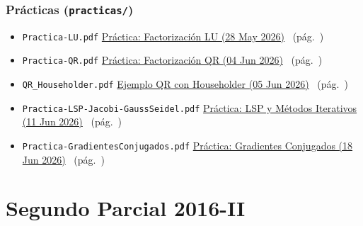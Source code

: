 \documentclass[11pt,a4paper]{article}
\begin{document}
\subsubsection*{Pr\'acticas (\texttt{practicas/})}
\begin{itemize}[leftmargin=0pt, itemsep=3pt, label={}]
  \item \texttt{Practica-LU.pdf}
    \dotfill \hyperref[sec:practica_lu_1]{Pr\'actica: Factorizaci\'on LU (28 May 2026)}
    \ (p\'ag.~\pageref{sec:practica_lu_1})

  \item \texttt{Practica-QR.pdf}
    \dotfill \hyperref[sec:practica_qr]{Pr\'actica: Factorizaci\'on QR (04 Jun 2026)}
    \ (p\'ag.~\pageref{sec:practica_qr})

  \item \texttt{QR\_Householder.pdf}
    \dotfill \hyperref[sec:householder_ejemplo]{Ejemplo QR con Householder (05 Jun 2026)}
    \ (p\'ag.~\pageref{sec:householder_ejemplo})

  \item \texttt{Practica-LSP-Jacobi-GaussSeidel.pdf}
    \dotfill \hyperref[sec:practica_lsp_jacobi]{Pr\'actica: LSP y M\'etodos Iterativos (11 Jun 2026)}
    \ (p\'ag.~\pageref{sec:practica_lsp_jacobi})

  \item \texttt{Practica-GradientesConjugados.pdf}
    \dotfill \hyperref[sec:practica_gc]{Pr\'actica: Gradientes Conjugados (18 Jun 2026)}
    \ (p\'ag.~\pageref{sec:practica_gc})
\end{itemize}

\newpage

\section{Segundo Parcial 2016-II}
\end{document}
